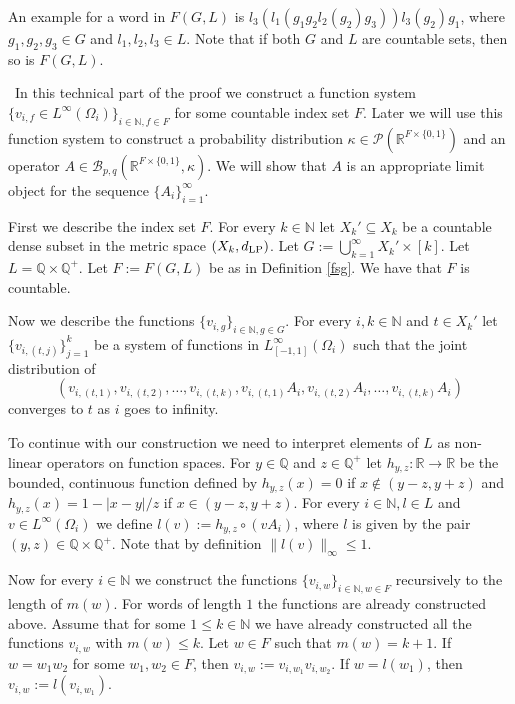 \documentclass[a4wider]{amsart}
\theoremstyle{definitionbreak}\newtheorem{D}[theorem]{Definition}
\theoremstyle{definitionbreak}\newtheorem*{D*}{Definition}
\begin{document}
An example for a word in $F(G,L)$ is $l_3(l_1(g_1g_2l_2(g_2)g_3))l_3(g_2)g_1$, where $g_1,g_2,g_3\in G$ and $l_1,l_2,l_3\in L$. Note that if both $G$ and $L$ are countable sets, then so is $F(G,L)$.




~In this technical part of the proof we construct a function system $\{v_{i,f}\in L^\infty(\Omega_i)\}_{i\in\mathbb{N},f\in F}$ for some countable index set $F$. Later we will use this function system to construct a probability distribution $\kappa\in\mathcal{P}(\mathbb{R}^{F\times\{0,1\}})$ and an operator $A\in \mathcal B_{p,q}(\mathbb{R}^{F\times\{0,1\}},\kappa)$. We will show that $A$ is an appropriate limit object for the sequence $\{A_i\}_{i=1}^\infty$. 

First we describe the index set $F$. For every $k\in\mathbb{N}$ let $X_k'\subseteq X_k$ be a countable dense subset in the metric space $(X_k,d_{\rm LP})$. Let $G:=\bigcup_{k=1}^\infty X_k'\times [k]$. Let $L=\mathbb{Q}\times\mathbb{Q}^+$. Let $F:=F(G,L)$ be as in Definition \ref{fsg}. We have that $F$ is countable.

Now we describe the functions $\{v_{i,g}\}_{i\in\mathbb{N},g\in G}$. For every $i,k\in\mathbb{N}$ and $t\in X_k'$ let $\{v_{i,(t,j)}\}_{j=1}^k$ be a system of functions in $L^\infty_{[-1,1]}(\Omega_i)$ such that the joint distribution of 
$$(v_{i,(t,1)},v_{i,(t,2)},\dots,v_{i,(t,k)},v_{i,(t,1)}A_i,v_{i,(t,2)}A_i,\dots,v_{i,(t,k)}A_i)$$
converges to $t$ as $i$ goes to infinity. 

To continue with our construction we need to interpret elements of $L$ as non-linear operators on function spaces. For $y\in\mathbb{Q}$ and $z\in\mathbb{Q}^+$ let $h_{y,z}:\mathbb{R}\to\mathbb{R}$ be the bounded, continuous function defined by $h_{y,z}(x)=0$ if $x\notin (y-z,y+z)$ and $h_{y,z}(x)=1-|x-y|/z$ if $x\in (y-z,y+z)$. For every $i\in\mathbb{N}, l\in L$ and $v\in L^{\infty}(\Omega_i)$ we define $l(v):=h_{y,z}\circ (v A_i)$, where $l$ is given by the pair $(y,z)\in\mathbb{Q}\times\mathbb{Q}^+$. Note that by definition $\|l(v)\|_\infty\leq 1$.

Now for every $i\in\mathbb{N}$ we construct the functions $\{v_{i,w}\}_{i\in\mathbb{N},w\in F}$ recursively to the length of $m(w)$. For words of length $1$ the functions are already constructed above. Assume that for some $1\leq k\in\mathbb{N}$ we have already constructed all the functions $v_{i,w}$ with $m(w)\leq k$. Let $w\in F$ such that $m(w)=k+1$. If $w=w_1w_2$ for some $w_1,w_2\in F$, then $v_{i,w}:=v_{i,w_1}v_{i,w_2}$. If $w=l(w_1)$, then $v_{i,w}:=l(v_{i,w_1})$.
\end{document}
